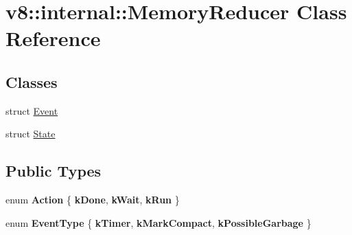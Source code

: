 \hypertarget{classv8_1_1internal_1_1MemoryReducer}{}\section{v8\+:\+:internal\+:\+:Memory\+Reducer Class Reference}
\label{classv8_1_1internal_1_1MemoryReducer}
\subsection*{Classes}
\begin{DoxyCompactItemize}
\item 
struct \mbox{\hyperlink{structv8_1_1internal_1_1MemoryReducer_1_1Event}{Event}}
\item 
struct \mbox{\hyperlink{structv8_1_1internal_1_1MemoryReducer_1_1State}{State}}
\end{DoxyCompactItemize}
\subsection*{Public Types}
\begin{DoxyCompactItemize}
\item 
\mbox{\label{classv8_1_1internal_1_1MemoryReducer_a458cd23d6f4121f9bd6bd3e3d241b4a7}} 
enum {\bfseries Action} \{ {\bfseries k\+Done}, 
{\bfseries k\+Wait}, 
{\bfseries k\+Run}
 \}
\item 
\mbox{\label{classv8_1_1internal_1_1MemoryReducer_a2853ab10b53e2913c5e06cc170d2d3bf}} 
enum {\bfseries Event\+Type} \{ {\bfseries k\+Timer}, 
{\bfseries k\+Mark\+Compact}, 
{\bfseries k\+Possible\+Garbage}
 \}
\end{DoxyCompactItemize}
